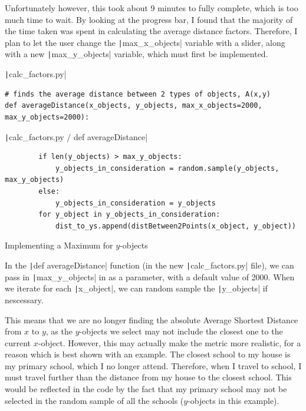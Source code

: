 \documentclass[12pt]{report}
\newcommand{\pil}[1]{\protect\texttt|#1|}
\begin{document}
Unfortunately however, this took about 9 minutes to fully complete, which is too much time to wait. By looking at the progress bar, I found that the majority of the time taken was spent in calculating the average distance factors. Therefore, I plan to let the user change the \pil{max_x_objects} variable with a slider, along with a new \pil{max_y_objects} variable, which must first be implemented.

\begin{listing}[H]
\pil{calc_factors.py}
\begin{verbatim}
# finds the average distance between 2 types of objects, A(x,y)
def averageDistance(x_objects, y_objects, max_x_objects=2000, max_y_objects=2000):
\end{verbatim}
\pil{calc_factors.py / def averageDistance}
\begin{verbatim}
        if len(y_objects) > max_y_objects:
            y_objects_in_consideration = random.sample(y_objects, max_y_objects)
        else:
            y_objects_in_consideration = y_objects
        for y_object in y_objects_in_consideration:
            dist_to_ys.append(distBetween2Points(x_object, y_object))
\end{verbatim}
\caption{Implementing a Maximum for $y$-objects}\label{cs:maxYobjects}
\end{listing}

In the \pil{def averageDistance} function (in the new \pil{calc_factors.py} file), we can pass in \pil{max_y_objects} in as a parameter, with a default value of 2000. When we iterate for each \pil{x_object}, we can random sample the \pil{y_objects} if nescessary.

This means that we are no longer finding the absolute Average Shortest Distance from $x$ to $y$, as the $y$-objects we select may not include the closest one to the current $x$-object. However, this may actually make the metric more realistic, for a reason which is best shown with an example. The closest school to my house is my primary school, which I no longer attend. Therefore, when I travel to school, I must travel further than the distance from my house to the closest school. This would be reflected in the code by the fact that my primary school may not be selected in the random sample of all the schools ($y$-objects in this example).

\begin{center}
\end{center}
\end{document}
